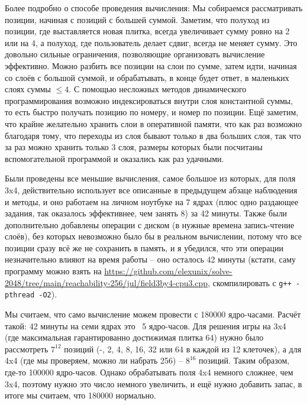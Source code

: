 \documentclass[a4paper,12pt]{article}
\begin{document}
Более подробно о способе проведения вычисления: Мы собираемся рассматривать позиции, начиная с позиций с большей суммой. Заметим, что полуход из позиции, где выставляется новая плитка, всегда увеличивает сумму ровно на 2 или на 4, а полуход, где пользователь делает сдвиг, всегда не меняет сумму. Это довольно сильные ограничения, позволяющие организовать вычисление эффективно. Можно разбить все позиции на слои по сумме, затем идти, начиная со слоёв с большой суммой, и обрабатывать, в конце будет ответ, в маленьких слоях суммы $\leq 4$. С помощью несложных методов динамического программирования возможно индексироваться внутри слоя константной суммы, то есть быстро получать позицию по номеру, и номер по позиции. Ещё заметим, что крайне желательно хранить слои в оперативной памяти, что как раз возможно благодаря тому, что переходы из слоя бывают только в два больших слоя, так что за раз можно хранить только 3 слоя, размеры которых были посчитаны вспомогательной программой и оказались как раз удачными.

Были проведены все меньшие вычисления, самое большое из которых, для поля 3x4, действительно использует все описанные в предыдущем абзаце наблюдения и методы, и оно работаем на личном ноутбуке на 7 ядрах (плюс одно раздающее задания, так оказалось эффективнее, чем занять 8) за 42 минуты. Также были дополнительно добавлены операции с диском (в нужные времена запись-чтение слоёв), без которых невозможно было бы в реальном вычислении, потому что все позиции сразу всё же не сохранить в память, и я убедился, что эти операции незначительно влияют на время работы -- оно осталось 42 минуты (кстати, саму программу можно взять на \url{https://github.com/elexunix/solve-2048/tree/main/reachability-256/jul/field3by4-cpu3.cpp}, скомпилировать с \verb|g++ -pthread -O2|).

Мы считаем, что само вычисление можем провести с 180000 ядро-часами. Расчёт такой: 42 минуты на семи ядрах это ~5 ядро-часов. Для решения игры на 3x4 (где максимальная гарантированно достижимая плитка 64) нужно было рассмотреть $7^{12}$ позиций (-, 2, 4, 8, 16, 32 или 64 в каждой из 12 клеточек), а для 4x4 (где мы проверяем, можно ли набрать 256) -- $8^{16}$ позиций. Таким образом, где-то 100000 ядро-часов. Однако обрабатывать поля 4x4 немного сложнее, чем 3x4, поэтому нужно это число немного увеличить, и ещё нужно добавить запас, в итоге мы считаем, что 180000 нормально.
\end{document}
